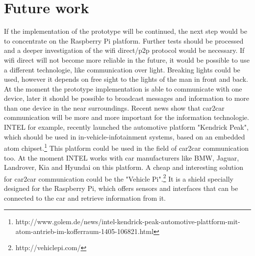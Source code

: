 \section{Future work}
\label{sec:FutureWork}
If the implementation of the prototype will be continued, the next step would be to concentrate on the Raspberry Pi platform. Further tests should be processed and a deeper investigation of the wifi direct/p2p protocol would be necessary. If wifi direct will not become more reliable in the future, it would be possible to use a different technologie, like communication over light. Breaking lights could be used, however it depends on free sight to the lights of the man in front and back. At the moment the prototype implementation is able to communicate with one device, later it should be possible to broadcast messages and information to more than one device in the near surroundings. Recent news show that car2car communication will be more and more important for the information technologie. INTEL for example, recently launched the automotive platform "Kendrick Peak", which should be used in in-vehicle-infotainment systems, based on an embedded atom chipset.\footnote{http://www.golem.de/news/intel-kendrick-peak-automotive-plattform-mit-atom-antrieb-im-kofferraum-1405-106821.html} This platform could be used in the field of car2car communication too. At the moment INTEL works with car manufacturers like BMW, Jaguar, Landrover, Kia and Hyundai on this platform. A cheap and interesting solution for car2car communication could be the "Vehicle Pi".\footnote{http://vehiclepi.com/} It is a shield specially designed for the Raspberry Pi, which offers sensors and interfaces that can be connected to the car and retrieve information from it. 